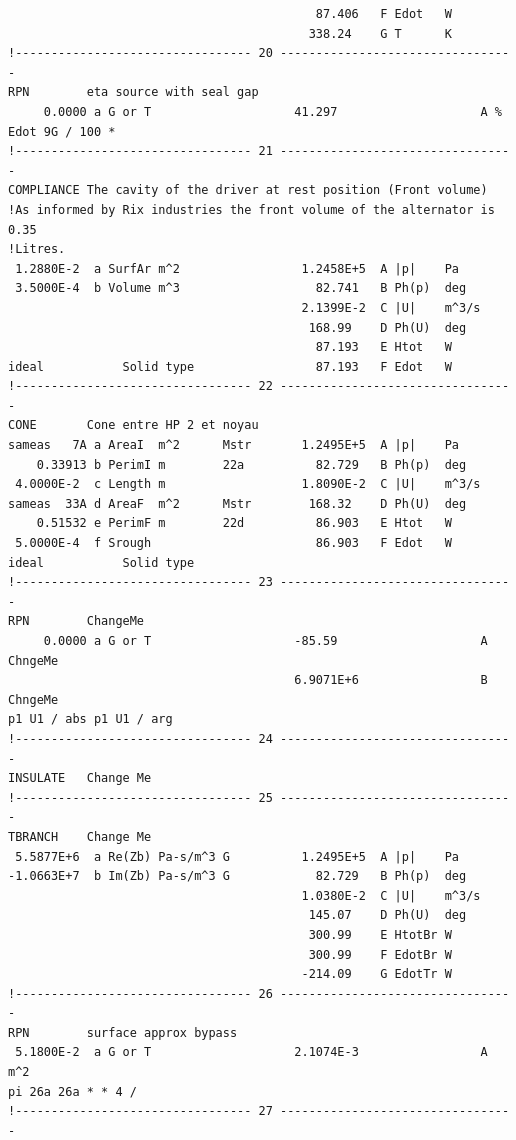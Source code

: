 \begin{linenumbers}
\begin{verbatim}
                                           87.406   F Edot   W
                                          338.24    G T      K
!--------------------------------- 20 ---------------------------------
RPN        eta source with seal gap
     0.0000 a G or T                    41.297                    A %
Edot 9G / 100 *
!--------------------------------- 21 ---------------------------------
COMPLIANCE The cavity of the driver at rest position (Front volume)
!As informed by Rix industries the front volume of the alternator is 0.35
!Litres.
 1.2880E-2  a SurfAr m^2                 1.2458E+5  A |p|    Pa
 3.5000E-4  b Volume m^3                   82.741   B Ph(p)  deg
                                         2.1399E-2  C |U|    m^3/s
                                          168.99    D Ph(U)  deg
                                           87.193   E Htot   W
ideal           Solid type                 87.193   F Edot   W
!--------------------------------- 22 ---------------------------------
CONE       Cone entre HP 2 et noyau
sameas   7A a AreaI  m^2      Mstr       1.2495E+5  A |p|    Pa
    0.33913 b PerimI m        22a          82.729   B Ph(p)  deg
 4.0000E-2  c Length m                   1.8090E-2  C |U|    m^3/s
sameas  33A d AreaF  m^2      Mstr        168.32    D Ph(U)  deg
    0.51532 e PerimF m        22d          86.903   E Htot   W
 5.0000E-4  f Srough                       86.903   F Edot   W
ideal           Solid type              
!--------------------------------- 23 ---------------------------------
RPN        ChangeMe
     0.0000 a G or T                    -85.59                    A ChngeMe
                                        6.9071E+6                 B ChngeMe
p1 U1 / abs p1 U1 / arg
!--------------------------------- 24 ---------------------------------
INSULATE   Change Me
!--------------------------------- 25 ---------------------------------
TBRANCH    Change Me
 5.5877E+6  a Re(Zb) Pa-s/m^3 G          1.2495E+5  A |p|    Pa
-1.0663E+7  b Im(Zb) Pa-s/m^3 G            82.729   B Ph(p)  deg
                                         1.0380E-2  C |U|    m^3/s
                                          145.07    D Ph(U)  deg
                                          300.99    E HtotBr W
                                          300.99    F EdotBr W
                                         -214.09    G EdotTr W
!--------------------------------- 26 ---------------------------------
RPN        surface approx bypass
 5.1800E-2  a G or T                    2.1074E-3                 A m^2
pi 26a 26a * * 4 /
!--------------------------------- 27 ---------------------------------

\end{verbatim}
\end{linenumbers}
